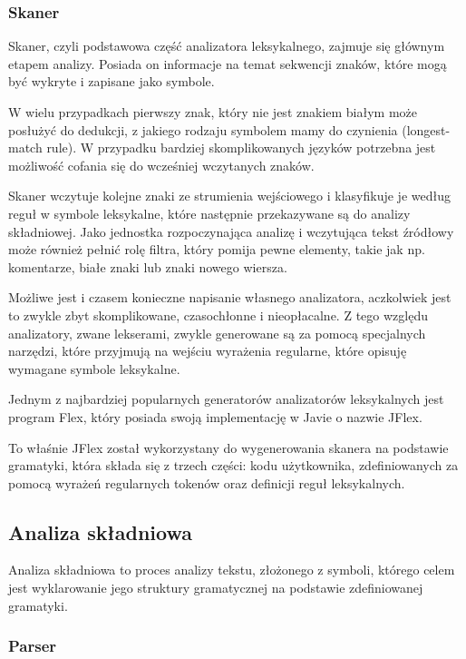 \documentclass[a4paper,12pt]{article}
\begin{document}
\subsubsection{Skaner}

Skaner, czyli podstawowa część analizatora leksykalnego, zajmuje się głównym etapem analizy. Posiada on informacje na temat sekwencji znaków, które mogą być wykryte i zapisane jako symbole.

W wielu przypadkach pierwszy znak, który nie jest znakiem białym może posłużyć do dedukcji, z jakiego rodzaju symbolem mamy do czynienia (longest-match rule). W przypadku bardziej skomplikowanych języków potrzebna jest możliwość cofania się do wcześniej wczytanych znaków.

Skaner wczytuje kolejne znaki ze strumienia wejściowego i klasyfikuje je według reguł w symbole leksykalne, które następnie przekazywane są do analizy składniowej. Jako jednostka rozpoczynająca analizę i wczytująca tekst źródłowy może również pełnić rolę filtra, który pomija pewne elementy, takie jak np. komentarze, białe znaki lub znaki nowego wiersza.

Możliwe jest i czasem konieczne napisanie własnego analizatora, aczkolwiek jest to zwykle zbyt skomplikowane, czasochłonne i nieopłacalne. Z tego względu analizatory, zwane lekserami, zwykle generowane są za pomocą specjalnych narzędzi, które przyjmują na wejściu wyrażenia regularne, które opisuję wymagane symbole leksykalne.

Jednym z najbardziej popularnych generatorów analizatorów leksykalnych jest program Flex\cite{flex}, który posiada swoją implementację w Javie o nazwie JFlex\cite{jflex}.

To właśnie JFlex został wykorzystany do wygenerowania skanera na podstawie gramatyki, która składa się z trzech części: kodu użytkownika, zdefiniowanych za pomocą wyrażeń regularnych tokenów oraz definicji reguł leksykalnych.

\subsection{Analiza składniowa}

Analiza składniowa to proces analizy tekstu, złożonego z symboli, którego celem jest wyklarowanie jego struktury gramatycznej na podstawie zdefiniowanej gramatyki.

\subsubsection{Parser}
\end{document}
